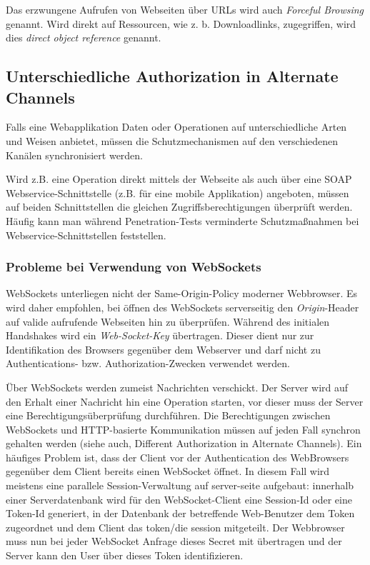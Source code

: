 Das erzwungene Aufrufen von Webseiten über URLs wird auch \textit{Forceful Browsing} genannt. Wird direkt auf Ressourcen, wie z. b. Downloadlinks, zugegriffen, wird dies \textit{direct object reference} genannt.

\subsection{Unterschiedliche Authorization in Alternate Channels}

Falls eine Webapplikation Daten oder Operationen auf unterschiedliche Arten und Weisen anbietet, müssen die Schutzmechanismen auf den verschiedenen Kanälen synchronisiert werden.

Wird z.B. eine Operation direkt mittels der Webseite als auch über eine SOAP Webservice-Schnittstelle (z.B. für eine mobile Applikation) angeboten, müssen auf beiden Schnittstellen die gleichen Zugriffsberechtigungen überprüft werden. Häufig kann man während Penetration-Tests verminderte Schutzmaßnahmen bei Webservice-Schnittstellen feststellen.

\subsubsection{Probleme bei Verwendung von WebSockets} 

WebSockets unterliegen nicht der Same-Origin-Policy moderner Webbrowser. Es wird daher empfohlen, bei öffnen des WebSockets serverseitig den \textit{Origin}-Header auf valide aufrufende Webseiten hin zu überprüfen. Während des initialen Handshakes wird ein \textit{Web-Socket-Key} übertragen. Dieser dient nur zur Identifikation des Browsers gegenüber dem Webserver und darf nicht zu Authentications- bzw. Authorization-Zwecken verwendet werden.

Über WebSockets werden zumeist Nachrichten verschickt. Der Server wird auf den Erhalt einer Nachricht hin eine Operation starten, vor dieser muss der Server eine Berechtigungsüberprüfung durchführen. Die Berechtigungen zwischen WebSockets und HTTP-basierte Kommunikation müssen auf jeden Fall synchron gehalten werden (siehe auch, Different Authorization in Alternate Channels).  
Ein häufiges Problem ist, dass der Client vor der Authentication des WebBrowsers gegenüber dem Client bereits einen WebSocket öffnet. In diesem Fall wird meistens eine parallele Session-Verwaltung auf server-seite aufgebaut: innerhalb einer Serverdatenbank wird für den WebSocket-Client eine Session-Id oder eine Token-Id generiert, in der Datenbank der betreffende Web-Benutzer dem Token zugeordnet und dem Client das token/die session mitgeteilt. Der Webbrowser muss nun bei jeder WebSocket Anfrage dieses Secret mit übertragen und der Server kann den User über dieses Token identifizieren.

